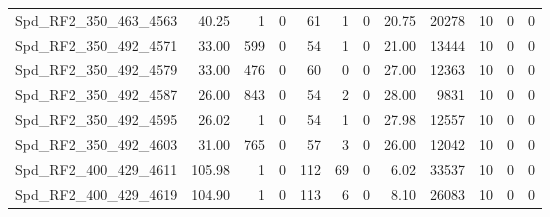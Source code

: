 \begin{longtable}[c]{@{}lrrrrrrrrrrr@{}}
Spd\_RF2\_350\_463\_4563     & 40.25                  & 1                       & 0                       & 61                     & 1                       & 0                       & 20.75                   & 20278                    & 10                       & 0                        & 0                        \\
Spd\_RF2\_350\_492\_4571     & 33.00                  & 599                     & 0                       & 54                     & 1                       & 0                       & 21.00                   & 13444                    & 10                       & 0                        & 0                        \\
Spd\_RF2\_350\_492\_4579     & 33.00                  & 476                     & 0                       & 60                     & 0                       & 0                       & 27.00                   & 12363                    & 10                       & 0                        & 0                        \\
Spd\_RF2\_350\_492\_4587     & 26.00                  & 843                     & 0                       & 54                     & 2                       & 0                       & 28.00                   & 9831                     & 10                       & 0                        & 0                        \\
Spd\_RF2\_350\_492\_4595     & 26.02                  & 1                       & 0                       & 54                     & 1                       & 0                       & 27.98                   & 12557                    & 10                       & 0                        & 0                        \\
Spd\_RF2\_350\_492\_4603     & 31.00                  & 765                     & 0                       & 57                     & 3                       & 0                       & 26.00                   & 12042                    & 10                       & 0                        & 0                        \\
Spd\_RF2\_400\_429\_4611     & 105.98                 & 1                       & 0                       & 112                    & 69                      & 0                       & 6.02                    & 33537                    & 10                       & 0                        & 0                        \\
Spd\_RF2\_400\_429\_4619     & 104.90                 & 1                       & 0                       & 113                    & 6                       & 0                       & 8.10                    & 26083                    & 10                       & 0                        & 0                        \\

\end{longtable}
